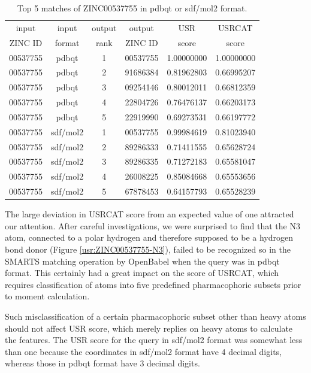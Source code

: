 \begin{table}
\caption{Top 5 matches of ZINC00537755 in pdbqt or sdf/mol2 format.}
\label{usr:ZINC00537755-Top5}
\begin{tabular}{cccccc}
\hline
input    & input  & output & output   & USR   & USRCAT\\
ZINC ID  & format & rank   & ZINC ID  & score & score\\
\hline
00537755 & pdbqt    & 1 & 00537755 & 1.00000000 & 1.00000000\\
00537755 & pdbqt    & 2 & 91686384 & 0.81962803 & 0.66995207\\
00537755 & pdbqt    & 3 & 09254146 & 0.80012011 & 0.66812359\\
00537755 & pdbqt    & 4 & 22804726 & 0.76476137 & 0.66203173\\
00537755 & pdbqt    & 5 & 22919990 & 0.69273531 & 0.66197772\\
00537755 & sdf/mol2 & 1 & 00537755 & 0.99984619 & 0.81023940\\
00537755 & sdf/mol2 & 2 & 89286333 & 0.71411555 & 0.65628724\\
00537755 & sdf/mol2 & 3 & 89286335 & 0.71272183 & 0.65581047\\
00537755 & sdf/mol2 & 4 & 26008225 & 0.85084668 & 0.65553656\\
00537755 & sdf/mol2 & 5 & 67878453 & 0.64157793 & 0.65528239\\
\hline
\end{tabular}
\end{table}

The large deviation in USRCAT score from an expected value of one attracted our attention. After careful investigations, we were surprised to find that the N3 atom, connected to a polar hydrogen and therefore supposed to be a hydrogen bond donor (Figure \ref{usr:ZINC00537755-N3}), failed to be recognized so in the SMARTS matching operation by OpenBabel \citep{968} when the query was in pdbqt format. This certainly had a great impact on the score of USRCAT, which requires classification of atoms into five predefined pharmacophoric subsets prior to moment calculation.

Such misclassification of a certain pharmacophoric subset other than heavy atoms should not affect USR score, which merely replies on heavy atoms to calculate the features. The USR score for the query in sdf/mol2 format was somewhat less than one because the coordinates in sdf/mol2 format have 4 decimal digits, whereas those in pdbqt format have 3 decimal digits.

